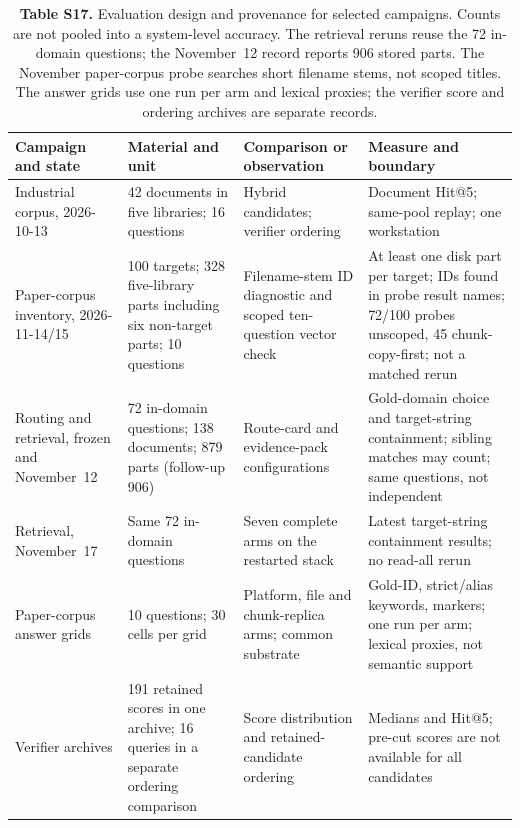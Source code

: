 \begin{table}
\centering
\footnotesize
\setlength{\tabcolsep}{4pt}
\caption{\textbf{Table S17.} Evaluation design and provenance for selected campaigns. Counts
are not pooled into a system-level accuracy. The retrieval reruns reuse the
72 in-domain questions; the November~12 record reports 906 stored parts.
The November paper-corpus probe searches short filename stems, not scoped
titles. The answer grids use one run per arm and lexical proxies; the verifier
score and ordering archives are separate records.}

\begin{tabular}{@{}p{2.640cm}p{3.465cm}p{4.125cm}p{4.950cm}@{}}
\toprule
Campaign and state & Material and unit & Comparison or observation & Measure and boundary\\
\midrule
Industrial corpus, 2026-10-13 & 42 documents in five libraries; 16 questions & Hybrid candidates; verifier ordering & Document Hit@5; same-pool replay; one workstation\\
Paper-corpus inventory, 2026-11-14/15 & 100 targets; 328 five-library parts including six non-target parts; 10 questions & Filename-stem ID diagnostic and scoped ten-question vector check & At least one disk part per target; IDs found in probe result names; 72/100 probes unscoped, 45 chunk-copy-first; not a matched rerun\\
Routing and retrieval, frozen and November~12 & 72 in-domain questions; 138 documents; 879 parts (follow-up 906) & Route-card and evidence-pack configurations & Gold-domain choice and target-string containment; sibling matches may count; same questions, not independent\\
Retrieval, November~17 & Same 72 in-domain questions & Seven complete arms on the restarted stack & Latest target-string containment results; no read-all rerun\\
Paper-corpus answer grids & 10 questions; 30 cells per grid & Platform, file and chunk-replica arms; common substrate & Gold-ID, strict/alias keywords, markers; one run per arm; lexical proxies, not semantic support\\
Verifier archives & 191 retained scores in one archive; 16 queries in a separate ordering comparison & Score distribution and retained-candidate ordering & Medians and Hit@5; pre-cut scores are not available for all candidates\\
\bottomrule
\end{tabular}
\end{table}

